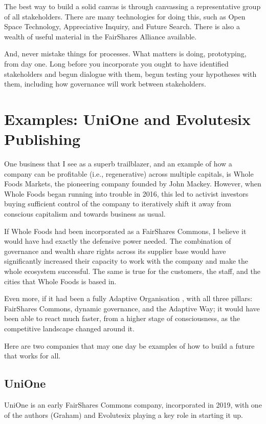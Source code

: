 The best way to build a solid canvas is through canvassing a representative group of all stakeholders. There are many technologies for doing this, such as Open Space Technology, Appreciative Inquiry, and Future Search. There is also a wealth of useful material in the FairShares Alliance available.


And, never mistake things for processes. What matters is doing, prototyping, from day one. Long before you incorporate you ought to have identified stakeholders and begun dialogue with them, begun testing your hypotheses with them, including how governance will work between stakeholders. 
\section{Examples: UniOne and Evolutesix Publishing}
One business that I see as a superb trailblazer, and an example of how a company can be profitable (i.e., regenerative) across multiple capitals, is Whole Foods Markets, the pioneering company founded by John Mackey. However, when Whole Foods  began running into trouble in 2016\cite{guardian-whole-foods}, this led to activist investors buying sufficient control of the company to iteratively shift it away from conscious capitalism and towards business as usual.


If Whole Foods had been incorporated as a FairShares Commons, I believe it would have had exactly the defensive power needed. The combination of governance and wealth share rights across its supplier base would have significantly increased their capacity to work with the company and make the whole ecosystem successful. The same is true for the customers, the staff, and the cities that Whole Foods is based in.


Even more, if it had been a fully Adaptive Organisation , with all three pillars: FairShares Commons, dynamic governance, and the Adaptive Way; it would have been able to react much faster, from a higher stage of consciousness, as the competitive landscape changed around it.


Here are two companies that may one day be examples of how to build a future that works for all. 
\subsection{UniOne}
UniOne is an early FairShares Commons company, incorporated in 2019, with one of the authors (Graham) and Evolutesix playing a key role in starting it up. 



